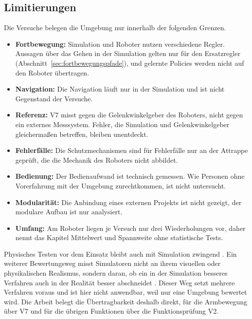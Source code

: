 \subsection{Limitierungen}
\label{sec:limitierungen}
Die Versuche belegen die Umgebung nur innerhalb der folgenden Grenzen.
\begin{itemize}
  \item \textbf{Fortbewegung:} Simulation und Roboter nutzen verschiedene Regler. Aussagen über das Gehen in der Simulation gelten nur für den Ersatzregler (Abschnitt~\ref{sec:fortbewegungspfade}), und gelernte Policies werden nicht auf den Roboter übertragen.
  \item \textbf{Navigation:} Die Navigation läuft nur in der Simulation und ist nicht Gegenstand der Versuche.
  \item \textbf{Referenz:} V7 misst gegen die Gelenkwinkelgeber des Roboters, nicht gegen ein externes Messsystem. Fehler, die Simulation und Gelenkwinkelgeber gleichermaßen betreffen, bleiben unentdeckt.
  \item \textbf{Fehlerfälle:} Die Schutzmechanismen sind für Fehlerfälle nur an der Attrappe geprüft, die die Mechanik des Roboters nicht abbildet.
  \item \textbf{Bedienung:} Der Bedienaufwand ist technisch gemessen. Wie Personen ohne Vorerfahrung mit der Umgebung zurechtkommen, ist nicht untersucht.
  \item \textbf{Modularität:} Die Anbindung eines externen Projekts ist nicht gezeigt, der modulare Aufbau ist nur analysiert.
  \item \textbf{Umfang:} Am Roboter liegen je Versuch nur drei Wiederholungen vor, daher nennt das Kapitel Mittelwert und Spannweite ohne statistische Tests.
\end{itemize}
Physisches Testen vor dem Einsatz bleibt auch mit Simulation zwingend \cite{Choi2021}.
Ein weiterer Bewertungsweg misst Simulatoren nicht an ihrem visuellen oder physikalischen Realismus, sondern daran, ob ein in der Simulation besseres Verfahren auch in der Realität besser abschneidet \cite{Kadian2020}.
Dieser Weg setzt mehrere Verfahren voraus und ist hier nicht anwendbar, weil nur eine Umgebung bewertet wird. Die Arbeit belegt die Übertragbarkeit deshalb direkt, für die Armbewegung über V7 und für die übrigen Funktionen über die Funktionsprüfung V2.

